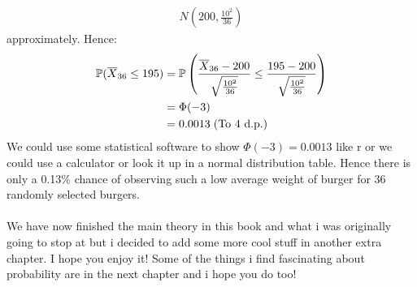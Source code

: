 \documentclass[,oneside]{article}
\begin{document}
\begin{enumerate}
\begin{align*}
N \left ( 200, \frac{10^2}{36} \right )
\end{align*}
approximately. Hence:
\begin{align*}
\mathbb{P}(\overline{X}_{36} \leq 195) &= \mathbb{P} \left ( \frac{\overline{X}_{36}-200}{\sqrt{\frac{10^2}{36}}} \leq \frac{195-200}{\sqrt{\frac{10^2}{36}}}\right )\\
&= \Phi (-3)\\
&= 0.0013 \hspace{0.1cm} \text{(To 4 d.p.)}
\end{align*}
We could use some statistical software to show $\Phi (-3) = 0.0013$ like r or we could use a calculator or look it up in a normal distribution table. Hence there is only a 0.13$\%$ chance of observing such a low average weight of burger for 36 randomly selected burgers.\\ \\
We have now finished the main theory in this book and what i was originally going to stop at but i decided to add some more cool stuff in another extra chapter. I hope you enjoy it! Some of the things i find fascinating about probability are in the next chapter and i hope you do too!
\pagebreak

\end{enumerate}
\end{document}

